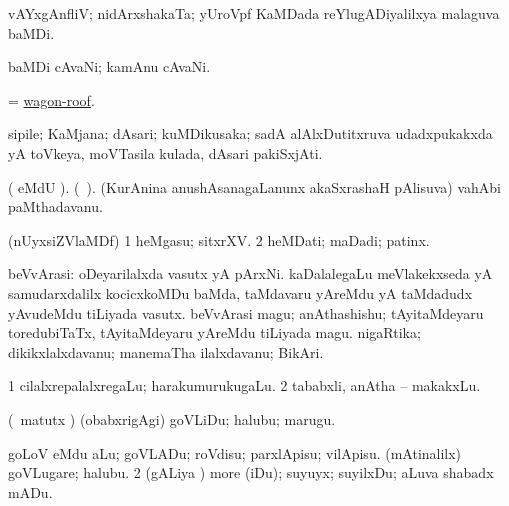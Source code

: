 \bentry
{} 
\gl{\nA}
\bmng
 vAYxgAnfliV; nidArxshakaTa; yUroVpf KaMDada reYlugADiyalilxya malaguva baMDi. 
\emng
\eentry

\bentry
{} 
\gl{\nA}
\expl{}
\bmng
baMDi cAvaNi; kamAnu cAvaNi. 
\emng
\eentry

\bentry
{} 
\gl{\nA}
\expl{}
\bmng
= \hyperlink{wagon-roof}{wagon-roof}. 
\emng
\eentry

\bentry
{} 
\gl{\nA}
\expl{}
\bmng
sipile; KaMjana; dAsari; kuMDikusaka; sadA alAlxDutitxruva udadxpukakxda yA toVkeya, moVTasila kulada, dAsari pakiSxjAti. 
\emng
\eentry

\bentry
{} 
\gl{\nA}
\expl{}
\bmng
( eMdU \parx). (\bava\ ). (KurAnina anushAsanagaLanunx akaSxrashaH pAlisuva) vahAbi paMthadavanu. 
\emng
\eentry

\bentry
{} 
\gl{\nA}
\bmng
(nUyxsiZVlaMDf) 
\bnum
\num{1} heMgasu; sitxrXV. 
\num{2} heMDati; maDadi; patinx. 
\enum
\emng
\eentry

\bentry
{} 
\gl{\nA}
\expl{}
\bmng
{} 
\emng
\eentry

\bentry
{} 
\gl{\nA}
\expl{}
\bmng
beVvArasi: 
\banum
{} oDeyarilalxda vasutx yA pArxNi. 
 kaDalalegaLu meVlakekxseda yA samudarxdalilx kocicxkoMDu baMda, taMdavaru yAreMdu yA taMdadudx yAvudeMdu tiLiyada vasutx. 
 beVvArasi magu; anAthashishu; tAyitaMdeyaru toredubiTaTx, tAyitaMdeyaru yAreMdu tiLiyada magu. 
 nigaRtika; dikikxlalxdavanu; manemaTha ilalxdavanu; BikAri. 
\eanum
\emng
\eentry

\bentry
{} 
\gl{\nA}
\expl{}
\bmng
\bnum
\num{1} cilalxrepalalxregaLu; harakumurukugaLu. 
\num{2} tababxli, anAtha -- makakxLu. 
\enum
\emng
\eentry

\bentry
{} 
\gl{\sakirx}
\expl{}
\bmng
(\kAparx\ matutx \alaMshA) (obabxrigAgi) goVLiDu; halubu; marugu. 
\emng

\noindent 
\gl{\akirx}
\expl{}
\bmng
\bnum
{} 
\banum
{} goLoV eMdu aLu; goVLADu; roVdisu; parxlApisu; vilApisu. 
 (mAtinalilx) goVLugare; halubu. 
\eanum
\numie
\num{2} (gALiya \vi) more (iDu); suyuyx; suyilxDu; aLuva shabadx mADu. 
\enum
\emng
\eentry

